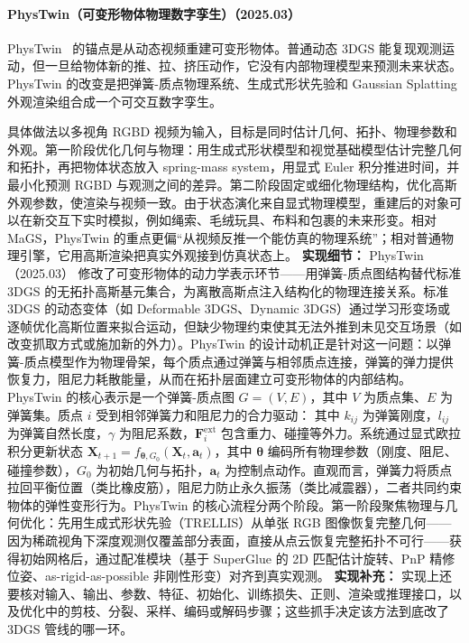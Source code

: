 \paragraph{PhysTwin（可变形物体物理数字孪生）（2025.03）}
PhysTwin~\cite{2503_17973} 的锚点是从动态视频重建可变形物体。普通动态 3DGS 能复现观测运动，但一旦给物体新的推、拉、挤压动作，它没有内部物理模型来预测未来状态。PhysTwin 的改变是把弹簧-质点物理系统、生成式形状先验和 Gaussian Splatting 外观渲染组合成一个可交互数字孪生。

具体做法以多视角 RGBD 视频为输入，目标是同时估计几何、拓扑、物理参数和外观。第一阶段优化几何与物理：用生成式形状模型和视觉基础模型估计完整几何和拓扑，再把物体状态放入 spring-mass system，用显式 Euler 积分推进时间，并最小化预测 RGBD 与观测之间的差异。第二阶段固定或细化物理结构，优化高斯外观参数，使渲染与视频一致。由于状态演化来自显式物理模型，重建后的对象可以在新交互下实时模拟，例如绳索、毛绒玩具、布料和包裹的未来形变。相对 MaGS，PhysTwin 的重点更偏“从视频反推一个能仿真的物理系统”；相对普通物理引擎，它用高斯渲染把真实外观接到仿真状态上。
\textbf{实现细节：} PhysTwin（2025.03） 修改了可变形物体的动力学表示环节——用弹簧-质点图结构替代标准 3DGS 的无拓扑高斯基元集合，为离散高斯点注入结构化的物理连接关系。标准 3DGS 的动态变体（如 Deformable 3DGS、Dynamic 3DGS）通过学习形变场或逐帧优化高斯位置来拟合运动，但缺少物理约束使其无法外推到未见交互场景（如改变抓取方式或施加新的外力）。PhysTwin 的设计动机正是针对这一问题：以弹簧-质点模型作为物理骨架，每个质点通过弹簧与相邻质点连接，弹簧的弹力提供恢复力，阻尼力耗散能量，从而在拓扑层面建立可变形物体的内部结构。PhysTwin 的核心表示是一个弹簧-质点图 $G=(V,E)$，其中 $V$ 为质点集、$E$ 为弹簧集。质点 $i$ 受到相邻弹簧力和阻尼力的合力驱动： 其中 $k_{ij}$ 为弹簧刚度，$l_{ij}$ 为弹簧自然长度，$\gamma$ 为阻尼系数，$\mathbf{F}_i^{\mathrm{ext}}$ 包含重力、碰撞等外力。系统通过显式欧拉积分更新状态 $\mathbf{X}_{t+1} = f_{\boldsymbol{\theta}, G_0}(\mathbf{X}_t, \mathbf{a}_t)$，其中 $\boldsymbol{\theta}$ 编码所有物理参数（刚度、阻尼、碰撞参数），$G_0$ 为初始几何与拓扑，$\mathbf{a}_t$ 为控制点动作。直观而言，弹簧力将质点拉回平衡位置（类比橡皮筋），阻尼力防止永久振荡（类比减震器），二者共同约束物体的弹性变形行为。PhysTwin 的核心流程分两个阶段。第一阶段聚焦物理与几何优化：先用生成式形状先验（TRELLIS）从单张 RGB 图像恢复完整几何——因为稀疏视角下深度观测仅覆盖部分表面，直接从点云恢复完整拓扑不可行——获得初始网格后，通过配准模块（基于 SuperGlue 的 2D 匹配估计旋转、PnP 精修位姿、as-rigid-as-possible 非刚性形变）对齐到真实观测。
\textbf{实现补充：} 实现上还要核对输入、输出、参数、特征、初始化、训练损失、正则、渲染或推理接口，以及优化中的剪枝、分裂、采样、编码或解码步骤；这些抓手决定该方法到底改了 3DGS 管线的哪一环。
